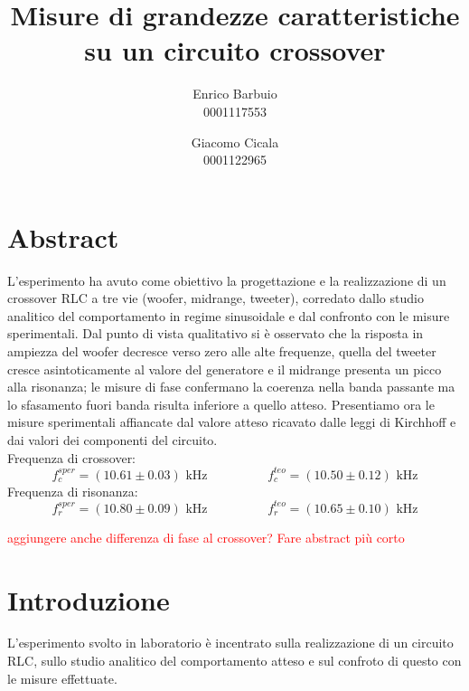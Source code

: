 \documentclass[12pt,italian]{article}
\title{Misure di grandezze caratteristiche su un circuito crossover}
\author{Enrico Barbuio \\ 0001117553 \and Giacomo Cicala \\ 0001122965}
\date{\err{data}}
\newcommand{\err}[1]{\textcolor{red}{#1}}
\begin{document}
\maketitle
\section*{Abstract}

L'esperimento ha avuto come obiettivo la progettazione e la realizzazione di un
crossover RLC a tre vie (woofer, midrange, tweeter), corredato dallo studio
analitico del comportamento in regime sinusoidale e dal confronto con le misure
sperimentali. Dal punto di vista qualitativo si è osservato che la risposta in
ampiezza del woofer decresce verso zero alle alte frequenze, quella del tweeter
cresce asintoticamente al valore del generatore e il midrange presenta un picco
alla risonanza; le misure di fase confermano la coerenza nella banda passante
ma lo sfasamento fuori banda risulta inferiore a quello atteso. Presentiamo ora
le misure sperimentali affiancate dal valore atteso ricavato dalle leggi di
Kirchhoff e dai valori dei componenti del circuito.\\ Frequenza di crossover:
\begin{equation*} f_{c}^{sper} = (10.61 \pm 0.03) \text{ kHz} \hspace{2cm}
	f_{c}^{teo} = (10.50 \pm 0.12) \text{ kHz} \end{equation*} \noindent Frequenza
di risonanza: \begin{equation*} f_{r}^{sper} = (10.80 \pm 0.09) \text{ kHz}
	\hspace{2cm} f_{r}^{teo} = (10.65 \pm 0.10) \text{ kHz} \end{equation*}

\err{aggiungere anche differenza di fase al crossover? Fare abstract più corto}

\section*{Introduzione}

L'esperimento svolto in laboratorio è incentrato sulla realizzazione di un
circuito RLC, sullo studio analitico del comportamento atteso e sul confroto di
questo con le misure effettuate.
\end{document}
